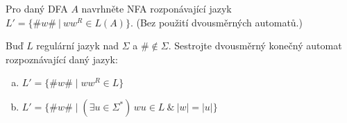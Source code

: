 \documentclass[a4paper,12pt]{amsart}
\begin{document}
\begin{problem}
    
    Pro daný DFA $A$ navrhněte NFA rozponávající jazyk $L'=\{\#w\#\ |\ ww^R\in L(A)\}$. (Bez použití dvousměrných automatů.)

\end{problem}


\medskip\begin{problem}
    
    Buď $L$ regulární jazyk nad $\Sigma$ a $\#\notin\Sigma$. Sestrojte dvousměrný konečný automat rozpoznávající daný jazyk: 
    
    \begin{enumerate}[(a)]
        \item $L' = \{\#w\#\mid ww^R \in L\}$
        \item $L' = \{\#w\#\mid (\exists u \in\Sigma^*)\, wu \in L\ \& \ |w|=|u|\}$
    \end{enumerate}

\end{problem}
\end{document}

